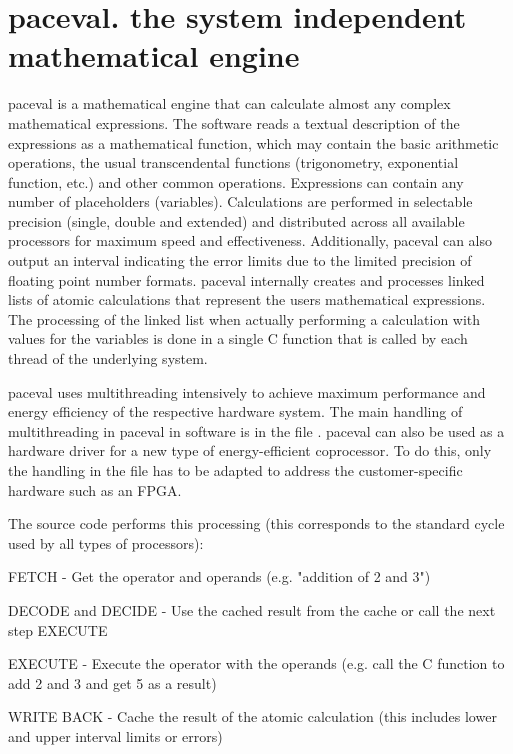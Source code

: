 \chapter{paceval. the system independent mathematical engine}
\hypertarget{index}{}\label{index}
paceval is a mathematical engine that can calculate almost any complex mathematical expressions. The software reads a textual description of the expressions as a mathematical function, which may contain the basic arithmetic operations, the usual transcendental functions (trigonometry, exponential function, etc.) and other common operations. Expressions can contain any number of placeholders (variables). Calculations are performed in selectable precision (single, double and extended) and distributed across all available processors for maximum speed and effectiveness. Additionally, paceval can also output an interval indicating the error limits due to the limited precision of floating point number formats. paceval internally creates and processes linked lists of atomic calculations that represent the user\textquotesingle{}s mathematical expressions. The processing of the linked list when actually performing a calculation with values for the variables is done in a single C function that is called by each thread of the underlying system.

paceval uses multithreading intensively to achieve maximum performance and energy efficiency of the respective hardware system. The main handling of multithreading in paceval in software is in the file . paceval can also be used as a hardware driver for a new type of energy-\/efficient coprocessor. To do this, only the handling in the file  has to be adapted to address the customer-\/specific hardware such as an FPGA.

The source code performs this processing (this corresponds to the standard cycle used by all types of processors)\+:
\begin{DoxyEnumerate}
\item FETCH -\/ Get the operator and operands (e.\+g. "{}addition of 2 and 3"{})
\item DECODE and DECIDE -\/ Use the cached result from the cache or call the next step EXECUTE
\item EXECUTE -\/ Execute the operator with the operands (e.\+g. call the C function to add 2 and 3 and get 5 as a result)
\item WRITE BACK -\/ Cache the result of the atomic calculation (this includes lower and upper interval limits or errors)
\end{DoxyEnumerate}

